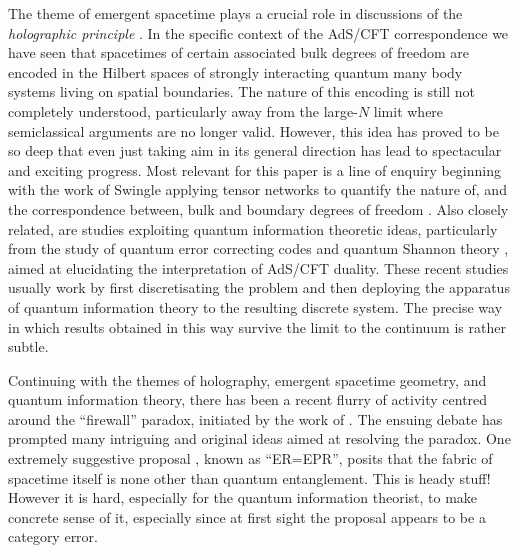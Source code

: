 \documentclass[11pt]{amsart}
\theoremstyle{plain}%
\theoremstyle{definition}
\theoremstyle{remark}
\begin{document}
The theme of emergent spacetime plays a crucial role in discussions of the \emph{holographic principle} \cite{bousso_holographic_2002}. In the specific context of the AdS/CFT correspondence \cite{maldacena_large_1999} we have seen that spacetimes of certain associated bulk degrees of freedom are encoded in the Hilbert spaces of strongly interacting quantum many body systems living on spatial boundaries. The nature of this encoding is still not completely understood, particularly away from the large-$N$ limit where semiclassical arguments are no longer valid. However, this idea has proved to be so deep that even just taking aim in its general direction has lead to spectacular and exciting progress. Most relevant for this paper is a line of enquiry beginning with the work of Swingle \cite{swingle_entanglement_2012} applying tensor networks to quantify the nature of, and the correspondence between, bulk and boundary degrees of freedom \cite{nozaki_holographic_2012,ryu_aspects_2006,ryu_holographic_2006}. Also closely related, are studies exploiting quantum information theoretic ideas, particularly from the study of quantum error correcting codes \cite{almheiri_bulk_2014,pastawski_holographic_2015} and quantum Shannon theory \cite{czech_information_2014}, aimed at elucidating the interpretation of AdS/CFT duality. These recent studies usually work by first discretisating the problem and then deploying the apparatus of quantum information theory to the resulting discrete system. The precise way in which results obtained in this way survive the limit to the continuum is rather subtle.

Continuing with the themes of holography, emergent spacetime geometry, and quantum information theory, there has been a recent flurry of activity centred around the ``firewall'' paradox, initiated by the work of \cite{almheiri_black_2013}. The ensuing debate has prompted many intriguing and original ideas aimed at resolving the paradox. One extremely suggestive proposal \cite{maldacena_cool_2013}, known as ``ER=EPR'', posits that the fabric of spacetime itself is none other than quantum entanglement. This is heady stuff! However it is hard, especially for the quantum information theorist, to make concrete sense of it, especially since at first sight the proposal appears to be a category error. 
\end{document}
